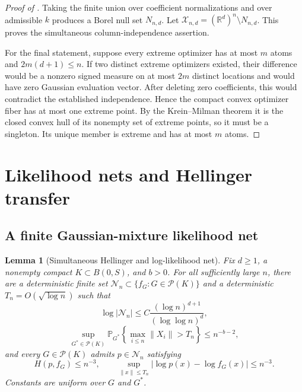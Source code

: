 \documentclass[11pt]{article}
\newtheorem{lemma}[lemma]{Lemma}
\theoremstyle{definition}
\theoremstyle{remark}
\newcommand{\Pcal}{\mathcal P}
\newcommand{\Ncal}{\mathcal N}
\newcommand{\RR}{\mathbb R}
\newcommand{\PP}{\mathbb P}
\newcommand{\norm}[1]{\lVert #1\rVert}
\newcommand{\abs}[1]{\lvert #1\rvert}
\begin{document}
\begin{proof}[Proof of ]
Taking the finite union over coefficient normalizations and over admissible
$k$ produces a Borel null set $N_{n,d}$.  Let
$\mathcal X_{n,d}=(\RR^d)^n\setminus N_{n,d}$.  This proves the simultaneous
column-independence assertion.

For the final statement, suppose every extreme optimizer has at most $m$
atoms and $2m(d+1)\le n$.  If two distinct extreme optimizers existed, their
difference would be a nonzero signed measure on at most $2m$ distinct
locations and would have zero Gaussian evaluation vector.  After deleting
zero coefficients, this would contradict the established independence.
Hence the compact convex optimizer fiber has at most one extreme point.  By
the Krein--Milman theorem it is the closed convex hull of its nonempty set of
extreme points, so it must be a singleton.  Its unique member is extreme and
has at most $m$ atoms.
\end{proof}

\section{Likelihood nets and Hellinger transfer}
\label{app:hellinger}

\subsection{A finite Gaussian-mixture likelihood net}

\begin{lemma}[Simultaneous Hellinger and log-likelihood net]
\label{lem:finite-net}
Fix $d\ge1$, a nonempty compact $K\subset B(0,S)$, and $b>0$.  For all
sufficiently large $n$, there are a deterministic finite set
$\Ncal_n\subset\{f_G:G\in\Pcal(K)\}$ and a deterministic
$T_n=O(\sqrt{\log n})$ such that
\begin{equation}\label{eq:net-size}
 \log\abs{\Ncal_n}
 \le C\frac{(\log n)^{d+1}}{(\log\log n)^d},
\end{equation}
\begin{equation}\label{eq:radius-prob}
 \sup_{G^*\in\Pcal(K)}
 \PP_{G^*}\left\{\max_{i\le n}\norm{X_i}>T_n\right\}
 \le n^{-b-2},
\end{equation}
and every $G\in\Pcal(K)$ admits $p\in\Ncal_n$ satisfying
\begin{equation}\label{eq:net-approx}
 H(p,f_G)\le n^{-3},
 \qquad
 \sup_{\norm{x}\le T_n}\abs{\log p(x)-\log f_G(x)}\le n^{-3}.
\end{equation}
Constants are uniform over $G$ and $G^*$.
\end{lemma}
\end{document}
